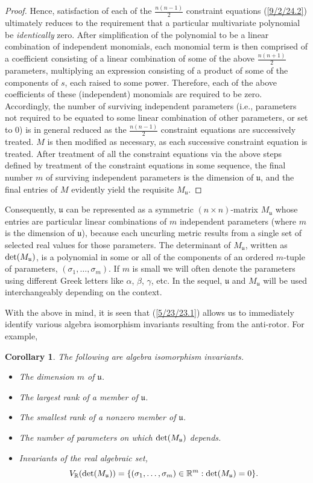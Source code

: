 \documentclass{amsart}
\newtheorem{corollary}[theorem]{Corollary}
\theoremstyle{definition}
\numberwithin{theorem}{section}
\numberwithin{equation}{section}
\begin{document}
\begin{proof}
Hence, satisfaction of each of the $\frac{n(n-1)}{2}$ constraint equations (\ref{9/2/24.2}) ultimately reduces to the requirement that a particular multivariate polynomial be {\it identically} zero.  After simplification of the polynomial to be a linear combination of independent monomials, each monomial term is then comprised of a coefficient consisting of a linear combination of some of the above $\frac{n(n+1)}{2}$ parameters, multiplying an expression consisting of a product of some of the components of $s$, each raised to some power.  Therefore, each of the above coefficients of these (independent) monomials are required to be zero.  Accordingly, the number of surviving independent parameters (i.e., parameters not required to be equated to some linear combination of other parameters, or set to 0) is in general reduced as the $\frac{n(n-1)}{2}$ constraint equations are successively treated.  $M$ is then modified as necessary, as each successive constraint equation is treated.  After treatment of all the constraint equations via the above steps defined by treatment of the constraint equations in some sequence, the final number $m$ of surviving independent parameters is the dimension of $\mathfrak{u}$, and the final entries of $M$ evidently yield the requisite $M_\mathfrak{u}$.
\end{proof}


Consequently, $\mathfrak{u}$ can be represented as a symmetric $(n\times n)$-matrix $M_{\mathfrak{u}}$ whose entries are particular linear combinations of $m$ independent parameters (where $m$ is the dimension of $\mathfrak{u}$), because each uncurling metric results from a single set of selected real values for those parameters.  The determinant of $M_{\mathfrak{u}}$, written as ${\rm det}(M_{\mathfrak{u}})$, is a polynomial in some or all of the components of an ordered $m$-tuple of parameters, $(\sigma_1,\dots,\sigma_m)$.  If $m$ is small  we will often denote the parameters using different Greek letters like $\alpha$, $\beta $, $\gamma$, etc. In the sequel, $\mathfrak{u}$ and $M_{\mathfrak{u}}$ will be used interchangeably depending on the context.


   With the above in mind, it is seen that (\ref{5/23/23.1}) allows us to immediately identify various algebra isomorphism invariants resulting from the anti-rotor. For example,
            
  \begin{corollary}\label{8/18/23.2} The following are algebra isomorphism invariants. \begin{itemize} \item The dimension $m$ of $\mathfrak{u}$.   \item The largest rank  of a member of $\mathfrak{u}$.  \item The smallest rank of a nonzero member of $\mathfrak{u}$. \item The number of parameters on which ${\rm det}(M_{\mathfrak{u}})$ depends. \item Invariants of the real algebraic set, \[V_\mathbb{R}({\rm det}(M_{\mathfrak{u}})) = \{(\sigma_1,\dots,\sigma_m)\in\mathbb{R}^m: {\rm det}(M_{\mathfrak{u}}) = 0 \}.\] \end{itemize} \end{corollary}
   
\end{document}
